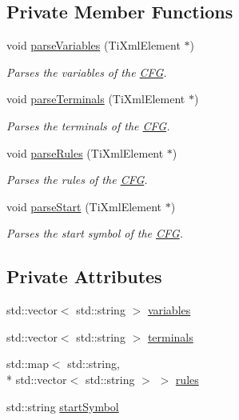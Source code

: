 \subsection*{Private Member Functions}
\begin{DoxyCompactItemize}
\item 
void \hyperlink{classCFGParser_ad743c15b7790fcd172b8a1ef7ece1473}{parse\-Variables} (Ti\-Xml\-Element $\ast$)
\begin{DoxyCompactList}\small\item\em Parses the variables of the \hyperlink{classCFG}{C\-F\-G}. \end{DoxyCompactList}\item 
void \hyperlink{classCFGParser_a525642f6ee69770c435e855e0609fa32}{parse\-Terminals} (Ti\-Xml\-Element $\ast$)
\begin{DoxyCompactList}\small\item\em Parses the terminals of the \hyperlink{classCFG}{C\-F\-G}. \end{DoxyCompactList}\item 
void \hyperlink{classCFGParser_a681f962f987adf57ba9ff8b3638fef14}{parse\-Rules} (Ti\-Xml\-Element $\ast$)
\begin{DoxyCompactList}\small\item\em Parses the rules of the \hyperlink{classCFG}{C\-F\-G}. \end{DoxyCompactList}\item 
void \hyperlink{classCFGParser_a1ca52cabb5cf726a0eb7a2668c3c0a5a}{parse\-Start} (Ti\-Xml\-Element $\ast$)
\begin{DoxyCompactList}\small\item\em Parses the start symbol of the \hyperlink{classCFG}{C\-F\-G}. \end{DoxyCompactList}\end{DoxyCompactItemize}
\subsection*{Private Attributes}
\begin{DoxyCompactItemize}
\item 
std\-::vector$<$ std\-::string $>$ \hyperlink{classCFGParser_a2be700c7eebe5a1a0fd18b88b3074840}{variables}
\item 
std\-::vector$<$ std\-::string $>$ \hyperlink{classCFGParser_a7242b5a22e08de31297dc9bbb367f5bc}{terminals}
\item 
std\-::map$<$ std\-::string, \\*
std\-::vector$<$ std\-::string $>$ $>$ \hyperlink{classCFGParser_a9bea0a4314c8f16ac9aaf0a801a42d86}{rules}
\item 
std\-::string \hyperlink{classCFGParser_a3a51f2f7a2f5342ce9016d226869a516}{start\-Symbol}
\end{DoxyCompactItemize}


